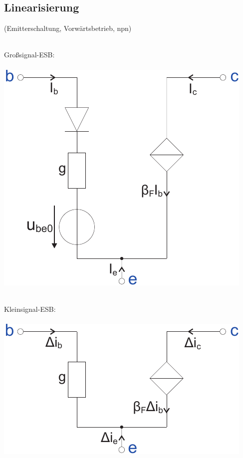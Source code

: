 \documentclass[a4paper,twocolumn,10pt]{article}
\begin{document}
\subsection*{Linearisierung}
(Emitterschaltung, Vorwärtsbetrieb, npn)\\\\
\begin{minipage}[t]{0.23\textwidth}
Großsignal-ESB:\\\\
\includegraphics[width=\textwidth]{Grafiken/Transistor_GSE}\\\\
\end{minipage}
\hfill
\begin{minipage}[t]{0.23\textwidth}
Kleinsignal-ESB:\\\\
\includegraphics[width=\textwidth]{Grafiken/Transistor_KSE}\\\\
\end{minipage}\\
\end{document}
